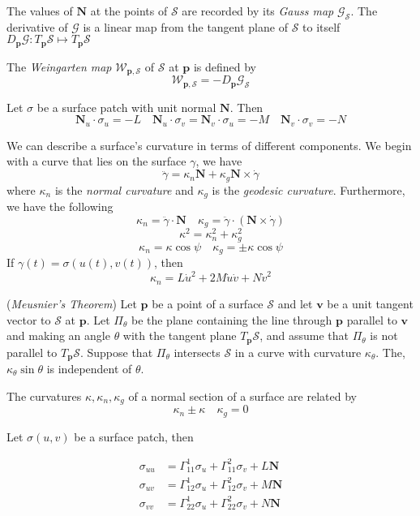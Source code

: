 \documentclass[12pt]{article}
\begin{document}
\begin{multicols*}{2}
The values of $\mathbf{N}$ at the points of $\mathcal{S}$ are recorded by its \textit{Gauss map} $\mathcal{G}_\mathcal{S}$. The derivative of $\mathcal{G}$ is a linear map from the tangent plane of $\mathcal{S}$ to itself $D_\mathbf{p}\mathcal{G} : T_\mathbf{p}\mathcal{S} \mapsto T_\mathbf{p}\mathcal{S}$

The \textit{Weingarten map} $\mathcal{W}_{\mathbf{p},\mathcal{S}}$ of $\mathcal{S}$ at $\mathbf{p}$ is defined by \[\mathcal{W}_{\mathbf{p}, \mathcal{S}} = - D_\mathbf{p}\mathcal{G}_\mathcal{S}\]

Let $\sigma$ be a surface patch with unit normal $\mathbf{N}$. Then \[\mathbf{N}_u \cdot \sigma_u = -L \quad \mathbf{N}_u \cdot \sigma_v = \mathbf{N}_v \cdot \sigma_u = -M \quad \mathbf{N}_v \cdot \sigma_v = -N\]

We can describe a surface's curvature in terms of different components. We begin with a curve that lies on the surface $\gamma$, we have \[\ddot{\gamma} = \kappa_n \mathbf{N} + \kappa_g \mathbf{N} \times \dot{\gamma}\] where $\kappa_n$ is the \textit{normal curvature} and $\kappa_g$ is the \textit{geodesic curvature}. Furthermore, we have the following \[\kappa_n = \ddot{\gamma} \cdot \mathbf{N}\quad\kappa_g = \ddot{\gamma} \cdot (\mathbf{N} \times \dot{\gamma})\]\[\kappa^2 = \kappa_n^2 + \kappa_g^2\]\[\kappa_n = \kappa\cos\psi\quad\kappa_g = \pm\kappa\cos\psi\]
If $\gamma(t) = \sigma(u(t), v(t))$, then \[\kappa_n = L\dot{u}^2 + 2M \dot{u}\dot{v} + N\dot{v}^2\]

(\textit{Meusnier's Theorem}) Let $\mathbf{p}$ be a point of a surface $\mathcal{S}$ and let $\mathbf{v}$ be a unit tangent vector to $\mathcal{S}$ at $\mathbf{p}$. Let $\Pi_\theta$ be the plane containing the line through $\mathbf{p}$ parallel to $\mathbf{v}$ and making an angle $\theta$ with the tangent plane $T_\mathbf{p}\mathcal{S}$, and assume that $\Pi_\theta$ is not parallel to $T_\mathbf{p}\mathcal{S}$. Suppose that $\Pi_\theta$ intersects $\mathcal{S}$ in a curve with curvature $\kappa_\theta$. The, $\kappa_\theta \sin \theta$ is independent of $\theta$.

The curvatures $\kappa, \kappa_n, \kappa_g$ of a normal section of a surface are related by \[\kappa_n \pm \kappa\quad\kappa_g = 0\]


Let $\sigma(u, v)$ be a surface patch, then 

\[\begin{aligned}
    \sigma_{uu} &= \Gamma_{11}^1\sigma_u + \Gamma_{11}^2\sigma_v + L\mathbf{N}\\
    \sigma_{uv} &= \Gamma_{12}^1\sigma_u + \Gamma_{12}^2\sigma_v + M\mathbf{N}\\
    \sigma_{vv} &= \Gamma_{22}^1\sigma_u + \Gamma_{22}^2\sigma_v + N\mathbf{N}\\
\end{aligned}\]


\end{multicols*}
\end{document}
